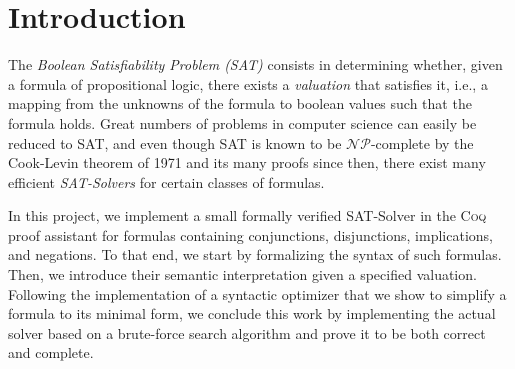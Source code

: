 \section{Introduction}\label{sec:intro}

The \emph{Boolean Satisfiability Problem (SAT)} consists in determining whether, given a formula of propositional logic, there exists a \emph{valuation} that satisfies it, i.e., a mapping from the unknowns of the formula to boolean values such that the formula holds. 
Great numbers of problems in computer science can easily be reduced to SAT, and even though SAT is known to be $\mathcal{NP}$-complete by the Cook-Levin theorem of 1971 \cite{cook1971} and its many proofs since then, there exist many efficient \emph{SAT-Solvers} for certain classes of formulas.

\bigbreak

In this project, we implement a small formally verified SAT-Solver in the \textsc{Coq} proof assistant for formulas containing conjunctions, disjunctions, implications, and negations. 
To that end, we start by formalizing the syntax of such formulas. 
Then, we introduce their semantic interpretation given a specified valuation. 
Following the implementation of a syntactic optimizer that we show to simplify a formula to its minimal form, we conclude this work by implementing the actual solver based on a brute-force search algorithm and prove it to be both correct and complete.